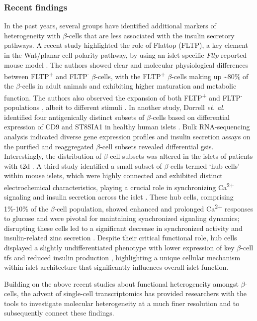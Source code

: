 \subsubsection{Recent findings}
In the past years, several groups have identified additional markers of heterogeneity with $\beta$-cells that are less associated with the insulin secretory pathways. A recent study highlighted the role of Flattop (FLTP), a key element in the Wnt/planar cell polarity pathway, by using an islet-specific \textit{Fltp} reported mouse model \textbf{\cite{bader_identification_2016,roscioni_impact_2016}}. The authors showed clear and molecular physiological differences between FLTP\textsuperscript{+} and FLTP\textsuperscript{-} $\beta$-cells, with the FLTP\textsuperscript{+} $\beta$-cells making up \textasciitilde80\% of the $\beta$-cells in adult animals and exhibiting higher maturation and metabolic function. The authors also observed the expansion of both FLTP\textsuperscript{+} and FLTP\textsuperscript{-} populations , albeit to different stimuli \textbf{\cite{bader_identification_2016}}. In another study, Dorrell \textit{et. al.} identified four antigenically distinct subsets of $\beta$-cells based on differential expression of CD9 and ST8SIA1 in healthy human islets \textbf{\cite{dorrell_human_2016}}. Bulk RNA-sequencing analysis indicated diverse gene expression profiles and insulin secretion assays on the purified and reaggregated $\beta$-cell subsets revealed differential \gls{gsis}. Interestingly, the distribution of $\beta$-cell subsets was altered in the islets of patients with \gls{t2d} \textbf{\cite{dorrell_human_2016}}. A third study identified a small subset of $\beta$-cells termed `hub cells' within mouse islets, which were highly connected and exhibited distinct electrochemical characteristics, playing a crucial role in synchronizing Ca\textsuperscript{2+} signaling and insulin secretion across the islet \textbf{\cite{johnston_beta_2016}}. These hub cells, comprising 1\%-10\% of the $\beta$-cell population, showed enhanced and prolonged Ca\textsuperscript{2+} responses to glucose and were pivotal for maintaining synchronized signaling dynamics; disrupting these cells led to a significant decrease in synchronized activity and insulin-related zinc secretion \textbf{\cite{johnston_beta_2016}}. Despite their critical functional role, hub cells displayed a slightly undifferentiated phenotype with lower expression of key $\beta$-cell \glspl{tf} and reduced insulin production \textbf{\cite{johnston_beta_2016}}, highlighting a unique cellular mechanism within islet architecture that significantly influences overall islet function.\\
\par Building on the above recent studies about functional heterogeneity amongst $\beta$-cells, the advent of single-cell transcriptomics has provided researchers with the tools to investigate molecular heterogeneity at a much finer resolution and to subsequently connect these findings.

